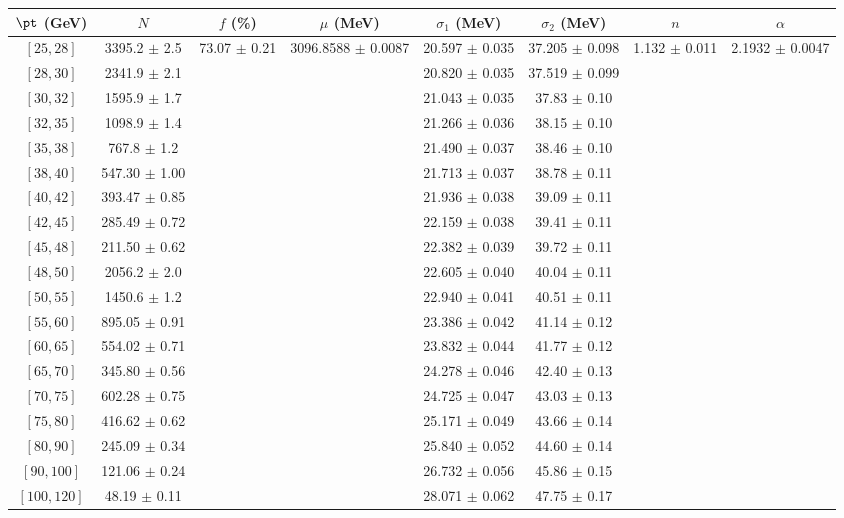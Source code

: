 \begin{tabular}{c||c|c|c|c|c|c|c}
$\pt$ (GeV) & $N$ & $f$ (\%) & $\mu$ (MeV) & $\sigma_1$ (MeV) & $\sigma_2$ (MeV) & $n$ & $\alpha$ \\
\hline
$[25, 28]$ & 3395.2 $\pm$ 2.5 & \multirow{19}{*}{73.07 $\pm$ 0.21} & \multirow{19}{*}{3096.8588 $\pm$ 0.0087} & 20.597 $\pm$ 0.035 & 37.205 $\pm$ 0.098 & \multirow{19}{*}{1.132 $\pm$ 0.011} & \multirow{19}{*}{2.1932 $\pm$ 0.0047}\\
$[28, 30]$ & 2341.9 $\pm$ 2.1 &  &  & 20.820 $\pm$ 0.035 & 37.519 $\pm$ 0.099 &  & \\
$[30, 32]$ & 1595.9 $\pm$ 1.7 &  &  & 21.043 $\pm$ 0.035 & 37.83 $\pm$ 0.10 &  & \\
$[32, 35]$ & 1098.9 $\pm$ 1.4 &  &  & 21.266 $\pm$ 0.036 & 38.15 $\pm$ 0.10 &  & \\
$[35, 38]$ & 767.8 $\pm$ 1.2 &  &  & 21.490 $\pm$ 0.037 & 38.46 $\pm$ 0.10 &  & \\
$[38, 40]$ & 547.30 $\pm$ 1.00 &  &  & 21.713 $\pm$ 0.037 & 38.78 $\pm$ 0.11 &  & \\
$[40, 42]$ & 393.47 $\pm$ 0.85 &  &  & 21.936 $\pm$ 0.038 & 39.09 $\pm$ 0.11 &  & \\
$[42, 45]$ & 285.49 $\pm$ 0.72 &  &  & 22.159 $\pm$ 0.038 & 39.41 $\pm$ 0.11 &  & \\
$[45, 48]$ & 211.50 $\pm$ 0.62 &  &  & 22.382 $\pm$ 0.039 & 39.72 $\pm$ 0.11 &  & \\
$[48, 50]$ & 2056.2 $\pm$ 2.0 &  &  & 22.605 $\pm$ 0.040 & 40.04 $\pm$ 0.11 &  & \\
$[50, 55]$ & 1450.6 $\pm$ 1.2 &  &  & 22.940 $\pm$ 0.041 & 40.51 $\pm$ 0.11 &  & \\
$[55, 60]$ & 895.05 $\pm$ 0.91 &  &  & 23.386 $\pm$ 0.042 & 41.14 $\pm$ 0.12 &  & \\
$[60, 65]$ & 554.02 $\pm$ 0.71 &  &  & 23.832 $\pm$ 0.044 & 41.77 $\pm$ 0.12 &  & \\
$[65, 70]$ & 345.80 $\pm$ 0.56 &  &  & 24.278 $\pm$ 0.046 & 42.40 $\pm$ 0.13 &  & \\
$[70, 75]$ & 602.28 $\pm$ 0.75 &  &  & 24.725 $\pm$ 0.047 & 43.03 $\pm$ 0.13 &  & \\
$[75, 80]$ & 416.62 $\pm$ 0.62 &  &  & 25.171 $\pm$ 0.049 & 43.66 $\pm$ 0.14 &  & \\
$[80, 90]$ & 245.09 $\pm$ 0.34 &  &  & 25.840 $\pm$ 0.052 & 44.60 $\pm$ 0.14 &  & \\
$[90, 100]$ & 121.06 $\pm$ 0.24 &  &  & 26.732 $\pm$ 0.056 & 45.86 $\pm$ 0.15 &  & \\
$[100, 120]$ & 48.19 $\pm$ 0.11 &  &  & 28.071 $\pm$ 0.062 & 47.75 $\pm$ 0.17 &  & \\
\end{tabular}
